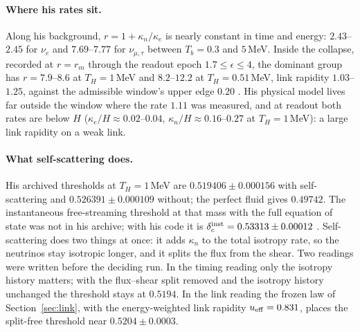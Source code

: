 \paragraph{Where his rates sit.} Along his background, $r=1+\kappa_n/\kappa_e$ is nearly constant in time and energy: $2.43$--$2.45$ for $\nu_e$ and $7.69$--$7.77$ for $\nu_{\mu,\tau}$ between $T_b=0.3$ and $5$\,MeV. Inside the collapse, recorded at $r=r_m$ through the readout epoch $1.7\le\epsilon\le4$, the dominant group has $r=7.9$--$8.6$ at $T_H=1$\,MeV and $8.2$--$12.2$ at $T_H=0.51$\,MeV, link rapidity $1.03$--$1.25$, against the admissible window's upper edge $0.20$ . His physical model lives far outside the window where the rate $1.11$ was measured, and at readout both rates are below $H$ ($\kappa_e/H\approx0.02$--$0.04$, $\kappa_n/H\approx0.16$--$0.27$ at $T_H=1$\,MeV): a large link rapidity on a weak link.

\paragraph{What self-scattering does.} His archived thresholds at $T_H=1$\,MeV are $0.519406\pm0.000156$ with self-scattering and $0.526391\pm0.000109$ without; the perfect fluid gives $0.49742$. The instantaneous free-streaming threshold at that mass with the full equation of state was not in his archive; with his code it is $\delta_c^{\rm inst}=0.53313\pm0.00012$ . Self-scattering does two things at once: it adds $\kappa_n$ to the total isotropy rate, so the neutrinos stay isotropic longer, and it splits the flux from the shear. Two readings were written before the deciding run. In the timing reading only the isotropy history matters; with the flux--shear split removed and the isotropy history unchanged the threshold stays at $0.5194$. In the link reading the frozen law of Section~\ref{sec:link}, with the energy-weighted link rapidity $u_{\rm eff}=0.831$, places the split-free threshold near $0.5204\pm0.0003$.

